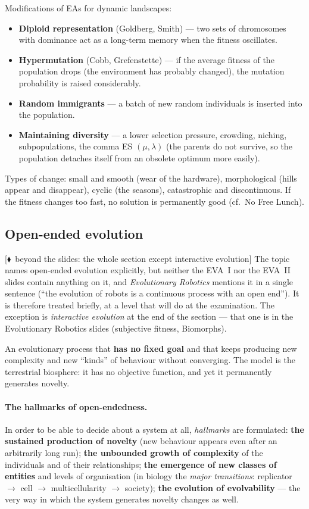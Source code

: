 \documentclass[11pt,a4paper]{article}
\theoremstyle{definition}
\providecommand{\uv}[1]{``#1''}
\newcommand{\mimoq}[1]{\textcolor{markcol}{\textsf{\footnotesize[$\blacklozenge$~beyond the slides: #1]}}}
\begin{document}
Modifications of EAs for dynamic landscapes:
\begin{itemize}
\item \textbf{Diploid representation} (Goldberg, Smith) --- two sets of
  chromosomes with dominance act as a long-term memory when the fitness
  oscillates.
\item \textbf{Hypermutation} (Cobb, Grefenstette) --- if the average fitness of
  the population drops (the environment has probably changed), the mutation
  probability is raised considerably.
\item \textbf{Random immigrants} --- a batch of new random individuals is
  inserted into the population.
\item \textbf{Maintaining diversity} --- a lower selection pressure, crowding,
  niching, subpopulations, the comma ES $(\mu,\lambda)$ (the parents do not
  survive, so the population detaches itself from an obsolete optimum more
  easily).
\end{itemize}
Types of change: small and smooth (wear of the hardware), morphological (hills
appear and disappear), cyclic (the seasons), catastrophic and discontinuous.
If the fitness changes too fast, no solution is permanently good
(cf.\ No Free Lunch).

\subsection{Open-ended evolution}
\label{ssec:otevrena}

\noindent\mimoq{the whole section except interactive evolution} The topic names open-ended
evolution explicitly, but neither the EVA~I nor the EVA~II slides contain anything on it,
and \emph{Evolutionary Robotics} mentions it in a single sentence (\uv{the evolution of
robots is a continuous process with an open end}). It is therefore treated briefly, at a
level that will do at the examination. The exception is \emph{interactive evolution} at the
end of the section --- that one is in the Evolutionary Robotics slides (subjective fitness,
Biomorphs).

\begin{defbox}
An evolutionary process that \textbf{has no fixed goal} and that keeps producing new
complexity and new \uv{kinds} of behaviour without converging. The model is the terrestrial
biosphere: it has no objective function, and yet it permanently generates novelty.
\end{defbox}

\paragraph{The hallmarks of open-endedness.} In order to be able to decide about a system at
all, \emph{hallmarks} are formulated: \textbf{the sustained production of novelty} (new
behaviour appears even after an arbitrarily long run); \textbf{the unbounded growth of
complexity} of the individuals and of their relationships; \textbf{the emergence of new
classes of entities} and levels of organisation (in biology the \emph{major transitions}:
replicator $\to$ cell $\to$ multicellularity $\to$ society); \textbf{the evolution of
evolvability} --- the very way in which the system generates novelty changes as well.
\end{document}
